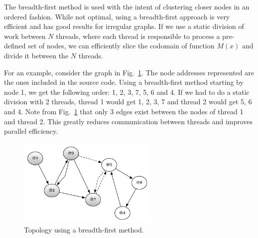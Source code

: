 The breadth-first method is used with the intent of clustering closer nodes in
an ordered fashion.  While not optimal, using a breadth-first approach is very
efficient and has good results for irregular graphs. If we use a static division
of work between $N$ threads, where each thread is responsible to process a
pre-defined set of nodes, we can efficiently slice the codomain of function
$M(x)$ and divide it between the $N$ threads.

For an example, consider the graph in Fig.~\ref{fig:compiler:topology1}. The
node addresses represented are the ones included in the source code. Using a
breadth-first method starting by node 1, we get the following order: 1, 2, 3, 7,
5, 6 and 4. If we had to do a static division with 2 threads, thread 1 would get
1, 2, 3, 7 and thread 2 would get 5, 6 and 4. Note from
Fig.~\ref{fig:compiler:topology1} that only 3 edges exist between the nodes of
thread 1 and thread 2. This greatly reduces communication between threads and
improves parallel efficiency.

\begin{figure}[ht]
  \centering
  \includegraphics[width=0.6\textwidth]{figures/compiler/topology1.pdf}
  \caption{Topology using a breadth-first method.}
  \label{fig:compiler:topology1}
\end{figure}
